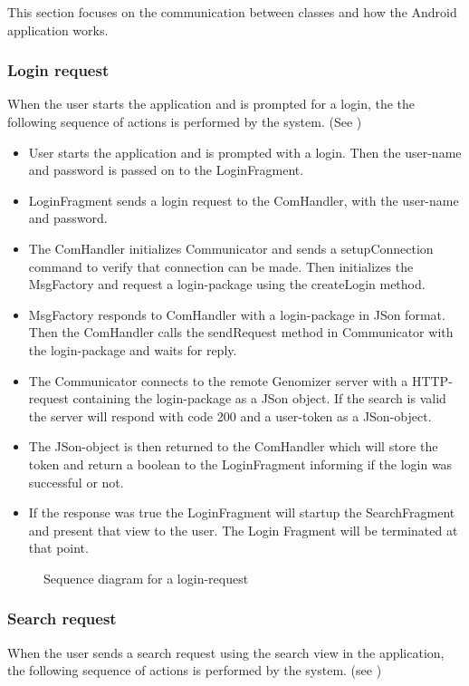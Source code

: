 This section focuses on the communication  between classes and how the Android application works.
\subsubsection{Login request}
	When the user starts the application and is prompted for a login, the the following sequence of actions is performed by the system. (See )	\\
	
	\begin{itemize}
		\item
			User starts the application and is prompted with a login.
			Then the user-name and password is passed on to the LoginFragment.
		\item
			LoginFragment sends a login request to the ComHandler, with the user-name and password.
		\item
			The ComHandler initializes Communicator and sends a setupConnection command to verify that connection can be made. Then initializes the MsgFactory and request a login-package using the createLogin method.
		\item
			MsgFactory responds to ComHandler with a login-package in JSon format. Then the ComHandler calls the sendRequest method in Communicator with the login-package and waits for reply.
		\item
			The Communicator connects to the remote Genomizer server with a HTTP-request containing the login-package as a JSon object. If the search is valid the server will respond with code 200 and a user-token as a JSon-object.
		\item
			The JSon-object is then returned to the ComHandler which will store the token and return a boolean to the LoginFragment informing if the login was successful or not.
		\item 
			If the response was true the LoginFragment will startup the SearchFragment and present that view to the user. The Login Fragment will be terminated at that point. 
			
	\end{itemize}

	\begin{figure}[h]
		\caption{Sequence diagram for a login-request}
		\label{fig:and_loginseq}
	\end{figure}
	
\subsubsection{Search request}
	When the user sends a search request using the search view in the application, the following sequence of actions is performed by the system.
	(see )
	
